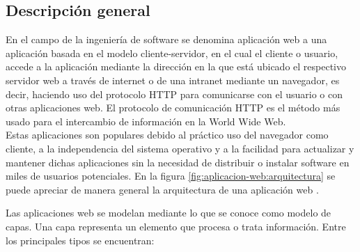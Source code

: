 %

\subsection{Descripción general}

En el campo de la ingeniería de software se denomina aplicación web a una 
aplicación basada en el modelo cliente-servidor, en el cual el cliente o 
usuario, accede a la aplicación mediante la dirección en la que está ubicado el 
respectivo servidor web a través de internet o de una intranet mediante un 
navegador, es decir, haciendo uso del protocolo HTTP para comunicarse con el 
usuario o con otras aplicaciones web. El protocolo de comunicación HTTP es el 
método más usado para el intercambio de información en la World Wide Web. \\

Estas aplicaciones son populares debido al práctico uso del navegador como 
cliente, a la independencia del sistema operativo y a la facilidad para 
actualizar y mantener dichas aplicaciones sin la necesidad de distribuir o 
instalar software en miles de usuarios potenciales. En la figura
\ref{fig:aplicacion-web:arquitectura} se puede apreciar de manera general la 
arquitectura de una aplicación web 
\cite{the:USB:puntos_venta, the:UDC:webapp_distributivo}.\\


\pagebreak

Las aplicaciones web se modelan mediante lo que se conoce como modelo de capas. 
Una capa representa un elemento que procesa o trata información. Entre los 
principales tipos se encuentran: \\

